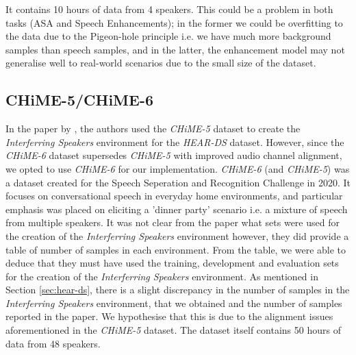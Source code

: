 \documentclass[logo,bsc,singlespacing,parskip,online]{infthesis}
\newcommand{\heards}{\textit{HEAR-DS}\xspace}
\newcommand{\chime}[1]{\textit{CHiME-#1}\xspace}
\begin{document}
It contains 10 hours of data from 4 speakers. This could be a problem in both tasks (ASA and Speech Enhancements); in the former
we could be overfitting to the data due to the Pigeon-hole principle i.e. we have much more background samples than speech samples, 
and in the latter, the enhancement model may not generalise well to real-world scenarios due to the small size of the dataset. 


\subsection{CHiME-5/CHiME-6}
In the paper by \citet{Huwel2020HearDS}, the authors used the \chime{5} dataset to create the \textit{Interferring Speakers} environment for the \heards dataset.
However, since the \chime{6} dataset supersedes \chime{5} with improved audio channel alignment, we opted to use \chime{6} for our implementation.
\chime{6} (and \chime{5}) was a dataset created for the Speech Seperation and Recognition Challenge in 2020. It 
focuses on conversational speech in everyday home environments, and particular emphasis was placed on 
eliciting a 'dinner party' scenario i.e. a mixture of speech from multiple speakers. It was not 
clear from the paper what sets were used for the creation of the \textit{Interferring Speakers} environment 
however, they did provide a table of number of samples in each environment. From the table, we 
were able to deduce that they must have used the training, development and evaluation sets for the creation of the \textit{Interferring Speakers} environment.
As mentioned in Section \ref{sec:hear-ds}, there is a slight discrepancy in the number of samples in the \textit{Interferring Speakers} environment, 
that we obtained and the number of samples reported in the paper. We hypothesise that this is due to the alignment issues aforementioned in the \chime{5} dataset.
The dataset itself contains 50 hours of data from 48 speakers.
\end{document}
